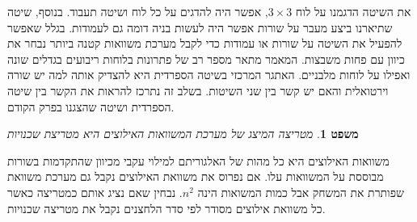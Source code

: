 \documentclass[12pt,leqno]{article}
\theoremstyle{theoremdd}
\newtheorem{theorem}{משפט}
\begin{document}
את השיטה הדגמנו על לוח 
$3 \times 3$,
אפשר היה להדגים על כל לוח ושיטה תעבוד.
בנוסף, שיטה שתיארנו ביצע מעבר על שורות אפשר היה לעשות בניה דומה גם לעמודות.
בגלל שאפשר להפעיל את השיטה על שורות או עמודות 
כדי לקבל מערכת משוואות קטנה ביותר נבחר 
את כיוון עם פחות משבצות.
המאמר 
\cite{B1}
מתאר מספר רב של פתרונות  בלוחות ריבועים בגדלים שונה ואפילו על לוחות מלבניים.
האתגר המרכזי בשיטה הספרדית היא להצדיק אותה למה יש שורה וירטואלית
והאם יש קשר בין שני השיטות.
בשלב זה נתרכז להראות את הקשר בין שיטה הספרדית ושיטה שהצגנו בפרק הקודם.
\begin{theorem}
    מטריצה המיצג של מערכת המשוואות האילוצים היא מטריצת שכנויות
\end{theorem}
משוואות האילוצים היא כל מהות של האלגוריתם למילוי עקבי
מכיוון שהתקדמות בשורות מבוססת על המשוואות עלו.
אם נפרוס את משוואת האילוצים נקבל גם מערכת משוואת שפותרת את המשחק
אבל כמות המשואות הינה 
$n^2$.
נבחין שאם נציג אותם כמטריצה כאשר כל משוואת אילוצים מסודר לפי סדר הלחצנים נקבל את מטריצה שכנויות.
\end{document}
